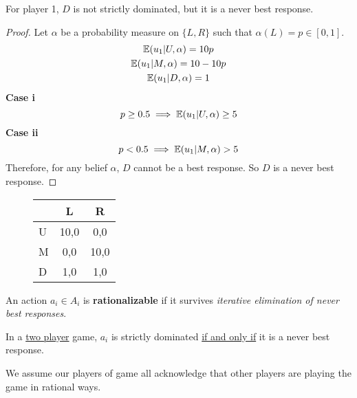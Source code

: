 \documentclass[11pt]{article}
\begin{document}
			\begin{example}
				For player 1, $D$ is not strictly dominated, but it is a never best response.
				\begin{proof}
					Let $\alpha$ be a probability measure on $\{L, R\}$ such that $\alpha(L) = p \in [0, 1]$.\\
					\begin{gather}
						\mathbb{E}({u_1|U,\alpha}) = 10p \\
						\mathbb{E}({u_1|M,\alpha}) = 10 - 10p \\
						\mathbb{E}({u_1|D,\alpha}) = 1
					\end{gather}
					\textbf{Case i}
					\begin{equation}
						p \geq 0.5 \implies \mathbb{E}({u_1|U,\alpha}) \geq 5
					\end{equation}
					\textbf{Case ii}
					\begin{equation}
						p < 0.5 \implies \mathbb{E}({u_1|M,\alpha}) > 5
					\end{equation}
					Therefore, for any belief $\alpha$, $D$ cannot be a best response. So $D$ is a never best response.
				\end{proof}
			\end{example}
			\begin{figure}[h]
				\centering
				\begin{tabular}{l|cc}
				  & L & R\\
				  \hline
				  U & 10,0 & 0,0 \\
				  M & 0,0 & 10,0\\
				  D & 1,0 & 1,0
				\end{tabular}
			\end{figure}
			
			\begin{definition}
				An action $a_i \in A_i$ is \textbf{rationalizable} if it survives \emph{iterative elimination of never best responses}.
			\end{definition}
			
			\begin{lemma}[i385.3]
				In a \ul{two player} game, $a_i$ is strictly dominated 
				\ul{if and only if} it is a never best response.
			\end{lemma}
			
			\begin{assumption}
				We assume our players of game all acknowledge that other players are playing the game in rational ways.
			\end{assumption}
		
\end{document}
